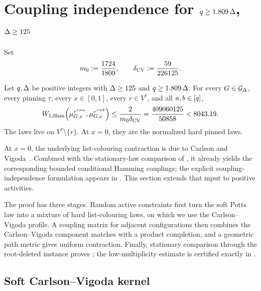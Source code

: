\section{\texorpdfstring{Coupling independence for \(q\ge1.809\,\Deg\), \(\Deg\ge125\)}
{Coupling independence for q >= 1.809 Delta, Delta >= 125}}
\label{sec:below-vigoda}

Set
\begin{equation}\label{eq:cv-main-constants}
  m_0:=\frac{1724}{1809},
  \qquad
  \delta_{\rm CV}:=\frac{59}{226125}.
\end{equation}

\begin{theorem}
\label{thm:cv-ci}
Let \(q,\Deg\) be positive integers with \(\Deg\ge125\) and
\(q\ge1.809\,\Deg\).  For every \(G\in\Gdeg\), every pinning \(\tau\),
every \(x\in[0,1]\), every \(r\in V^\tau\), and all
\(a,b\in\colours\),
\begin{equation}\label{eq:cv-ci}
  \WHam\!\left(
    \mupin{G}{\tau^{r=a}}{x},
    \mupin{G}{\tau^{r=b}}{x}
  \right)
  \le \frac{2}{m_0\delta_{\rm CV}}
  =\frac{409060125}{50858}<8043.19.
\end{equation}
The laws live on \(V^\tau\setminus\{r\}\).  At \(x=0\), they are the
normalized hard pinned laws.
\end{theorem}

At \(x=0\), the underlying list-colouring contraction is due to Carlson and
Vigoda~\cite[Theorem~4.12 and the proof of Corollary~1.2]{CarlsonVigoda2024}.
Combined with the stationary-law comparison of
\cite[Lemma~4.3]{BlancaEtAl2022Coupling}, it already yields the corresponding
bounded conditional Hamming couplings; the explicit coupling-independence
formulation appears in \cite[Theorem~20 and Proposition~21]{CFFGZZ2024}.
This section extends that input to positive activities.

The proof has three stages.  Random active constraints first turn the soft
Potts law into a mixture of hard list-colouring laws, on which we use the
Carlson--Vigoda profile.  A coupling matrix for adjacent configurations
then combines the Carlson--Vigoda component matches with a product
completion, and a geometric path metric gives uniform contraction.
Finally, stationary comparison through the root-deleted instance proves
; the low-multiplicity estimate is certified exactly in
.

\subsection{Soft Carlson--Vigoda kernel}


